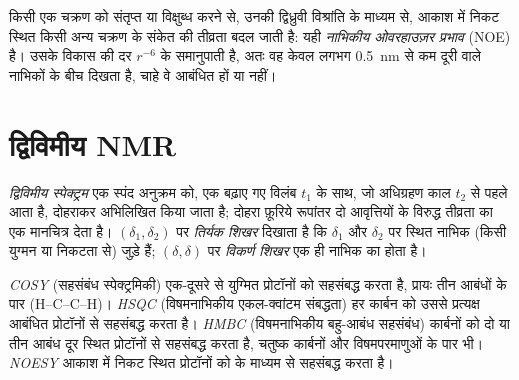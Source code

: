 \begin{definition}[नाभिकीय ओवरहाउज़र प्रभाव]\label{def:b3:advanced-nmr:noe}
किसी एक चक्रण को संतृप्त या विक्षुब्ध करने से, उनकी द्विध्रुवी
विश्रांति के माध्यम से, आकाश में निकट स्थित किसी अन्य चक्रण के संकेत की तीव्रता बदल जाती है:
यही \emph{नाभिकीय ओवरहाउज़र प्रभाव} (NOE) है।
उसके विकास की दर $r^{-6}$ के समानुपाती है, अतः वह केवल लगभग \qty{0.5}{nm} से कम दूरी
वाले नाभिकों के बीच दिखता है, चाहे वे आबंधित हों या नहीं।
\end{definition}

\section{द्विविमीय NMR}

\begin{definition}[द्विविमीय स्पेक्ट्रम, तिर्यक शिखर, विकर्ण शिखर]\label{def:b3:advanced-nmr:two-d}
\emph{द्विविमीय स्पेक्ट्रम} एक स्पंद अनुक्रम को,
एक बढ़ाए गए विलंब $t_1$ के साथ, जो अधिग्रहण काल $t_2$ से पहले आता है, दोहराकर
अभिलिखित किया जाता है; दोहरा फ़ूरिये रूपांतर दो आवृत्तियों के विरुद्ध
तीव्रता का एक मानचित्र देता है। $(\delta_1,
\delta_2)$ पर \emph{तिर्यक शिखर} दिखाता है कि $\delta_1$ और $\delta_2$ पर स्थित नाभिक
(किसी युग्मन या निकटता से) जुड़े हैं; $(\delta, \delta)$ पर \emph{विकर्ण शिखर}
एक ही नाभिक का होता है।
\end{definition}

\begin{definition}\label{def:b3:advanced-nmr:experiments}
\emph{COSY} (सहसंबंध स्पेक्ट्रमिकी) एक-दूसरे से युग्मित प्रोटॉनों को
सहसंबद्ध करता है, प्रायः तीन आबंधों के पार (H--C--C--H)। \emph{HSQC}
(विषमनाभिकीय एकल-क्वांटम संबद्धता) हर कार्बन को उससे प्रत्यक्ष आबंधित
प्रोटॉनों से सहसंबद्ध करता है। \emph{HMBC} (विषमनाभिकीय
बहु-आबंध सहसंबंध) कार्बनों को दो या तीन आबंध दूर स्थित प्रोटॉनों से सहसंबद्ध करता है,
चतुष्क कार्बनों और विषमपरमाणुओं के पार भी। \emph{NOESY}
आकाश में निकट स्थित प्रोटॉनों को  के माध्यम से सहसंबद्ध करता है।
\end{definition}

